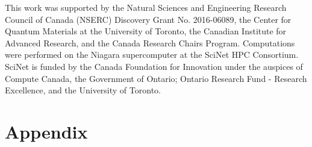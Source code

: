 \documentclass[%
reprint,
superscriptaddress,
 amsmath,amssymb,
 aps,
prb,
nobalancelastpage,
]{revtex4-2}
\begin{document}






\vspace{1em}
\begin{acknowledgments}
This work was supported by the Natural Sciences and Engineering Research Council of Canada (NSERC) Discovery Grant No. 2016-06089, the Center for Quantum Materials at
the University of Toronto, the Canadian Institute for
Advanced Research, and the Canada Research Chairs Program. Computations were performed on the
Niagara supercomputer at the SciNet HPC Consortium.
SciNet is funded by the Canada Foundation for Innovation under the auspices of Compute Canada, the Government of Ontario; Ontario Research Fund - Research Excellence, and the University of Toronto.
\end{acknowledgments}







\section*{Appendix}
\end{document}
